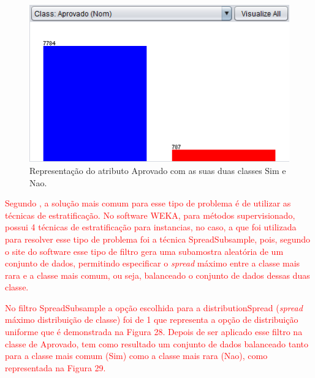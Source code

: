 \par
\begin{figure}[!htp]
	\begin{center}
    \caption{\label{fig:waveform_fig} Representação do atributo Aprovado com as suas duas classes Sim e Nao.}
	\includegraphics[scale=0.90]{Figuras/Atributo_aprovado.png}
	\end{center}
\end{figure}

\par
\textcolor{red}{Segundo , a solução mais comum para esse tipo de problema é de utilizar as técnicas de estratificação. No software WEKA, para métodos supervisionado, possui 4 técnicas de estratificação para instancias, no caso, a que foi utilizada para resolver esse tipo de problema foi a técnica SpreadSubsample, pois, segundo o site do software  esse tipo de filtro gera uma subamostra aleatória de um conjunto de dados, permitindo especificar o \textit{spread} máximo entre a classe mais rara e a classe mais comum, ou seja, balanceado o conjunto de dados dessas duas classe.}

\par
\textcolor{red}{No filtro SpreadSubsample a opção escolhida para a distributionSpread (\textit{spread} máximo distribuição de classe) foi de 1 que representa a opção de distribuição uniforme que é demonstrada na Figura 28. Depois de ser aplicado esse filtro na classe de Aprovado, tem como resultado um conjunto de dados balanceado tanto para a classe mais comum (Sim) como a classe mais rara (Nao), como representada na Figura 29.}

